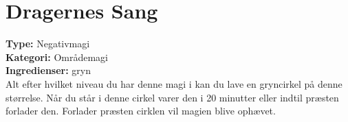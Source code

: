 \section{Dragernes Sang}
\textbf{Type:} Negativmagi\\
\textbf{Kategori:} Områdemagi\\
\textbf{Ingredienser:} gryn\\
Alt efter hvilket niveau du har denne magi i kan du lave en gryncirkel på denne størrelse. Når du står i denne cirkel varer den i 20 minutter eller indtil præsten forlader den. Forlader præsten cirklen vil magien blive ophævet.
